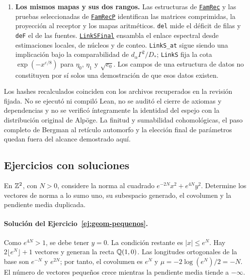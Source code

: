 \begin{enumerate}
\item \textbf{Los mismos mapas y sus dos rangos.}
Las estructuras de
\href{https://github.com/CocoSgt/riemann-hypothesis-lean/blob/7cbf7a0c32fca1badf05931879a37c3f8a2b03b4/src/Formalism/LocalToGlobal/GlobalTheory/FamRec.lean}{\texttt{FamRec}}
y las pruebas seleccionadas de
\href{https://github.com/CocoSgt/riemann-hypothesis-lean/blob/7cbf7a0c32fca1badf05931879a37c3f8a2b03b4/src/Formalism/LocalToGlobal/GlobalTheory/FamRecP.lean}{\texttt{FamRecP}}
identifican las matrices comprimidas, la proyección al
receptor y los mapas aritméticos.
\texttt{del} mide el déficit de filas y \texttt{deF}
el de las fuentes.
\href{https://github.com/CocoSgt/riemann-hypothesis-lean/blob/7cbf7a0c32fca1badf05931879a37c3f8a2b03b4/src/Formalism/LocalToGlobal/SiegelLatticeTheory/FlagStabilizerTensors/LinkSFinal.lean}{\texttt{LinkSFinal}}
ensambla el enlace espectral desde estimaciones locales,
de núcleos y de conteo.
\texttt{LinkS\_at} sigue siendo una implicación bajo la
comparabilidad de $d_\alpha\Gamma^2/D_*$;
\texttt{LinkS} fija la cota
$\exp(-x^{\varepsilon/8})$ para $\eta_0$, $\eta_1$
y $\sqrt{e_0}$.
Los campos de una estructura de datos no constituyen
por sí solos una demostración de que esos datos existen.
\end{enumerate}
\endgroup

Los hashes recalculados coinciden con los archivos recuperados
en la revisión fijada. No se ejecutó ni compiló Lean, no se
auditó el cierre de axiomas y dependencias y no se verificó
íntegramente la identidad del espejo con la distribución
original de Alpöge. La finitud y sumabilidad cohomológicas,
el paso completo de Bergman al retículo automorfo y la elección
final de parámetros quedan fuera del alcance demostrado aquí.

\subsection{Ejercicios con soluciones}

\begin{ejercicio}\label{ej:geom-pequenos}
En $\mathbb{Z}^2$, con $N>0$, considere la norma al cuadrado
$e^{-2N}x^2+e^{4N}y^2$.
Determine los vectores de norma a lo sumo uno, su subespacio
generado, el covolumen y la pendiente media duplicada.
\end{ejercicio}

\paragraph{Solución del Ejercicio~\ref{ej:geom-pequenos}.}
Como $e^{4N}>1$, se debe tener $y=0$.
La condición restante es $|x|\le e^N$.
Hay $2\lfloor e^N\rfloor+1$ vectores y generan la recta
$\mathbb{Q}(1,0)$.
Las longitudes ortogonales de la base son $e^{-N}$ y
$e^{2N}$; por tanto, el covolumen es $e^N$ y
$\mu=-2\log(e^N)/2=-N$.
El número de vectores pequeños crece mientras la pendiente
media tiende a $-\infty$.

